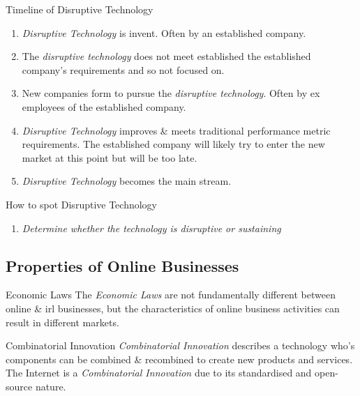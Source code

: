 \documentclass[11pt,a4paper]{article}
\begin{document}
\begin{proposition}{Timeline of Disruptive Technology}
  \begin{enumerate}
    \item \textit{Disruptive Technology} is invent. Often by an established company.
    \item The \textit{disruptive technology} does not meet established the established company's requirements and so not focused on.
    \item New companies form to pursue the \textit{disruptive technology}. Often by ex employees of the established company.
    \item \textit{Disruptive Technology} improves \& meets traditional performance metric requirements. The established company will likely try to enter the new market at this point but will be too late.
    \item \textit{Disruptive Technology} becomes the main stream.
  \end{enumerate}
\end{proposition}

\begin{proposition}{How to spot Disruptive Technology}
  \begin{enumerate}
    \item \textit{Determine whether the technology is disruptive or sustaining}
  \end{enumerate}
\end{proposition}

\subsection{Properties of Online Businesses}

\begin{remark}{Economic Laws}
  The \textit{Economic Laws} are not fundamentally different between online \& irl businesses, but the characteristics of online business activities can result in different markets.
\end{remark}

\begin{definition}{Combinatorial Innovation}
  \textit{Combinatorial Innovation} describes a technology who's components can be combined \& recombined to create new products and services. The Internet is a \textit{Combinatorial Innovation} due to its standardised and open-source nature.
\end{definition}
\end{document}
